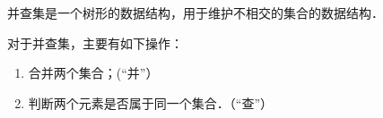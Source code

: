 
并查集是一个树形的数据结构，用于维护不相交的集合的数据结构．

对于并查集，主要有如下操作：
\begin{enumerate}
\item 合并两个集合；(“并”）

\item 判断两个元素是否属于同一个集合．（“查”）

\end{enumerate}